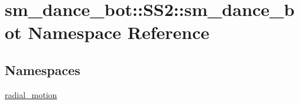 \hypertarget{namespacesm__dance__bot_1_1SS2_1_1sm__dance__bot}{}\section{sm\+\_\+dance\+\_\+bot\+:\+:S\+S2\+:\+:sm\+\_\+dance\+\_\+bot Namespace Reference}
\label{namespacesm__dance__bot_1_1SS2_1_1sm__dance__bot}
\subsection*{Namespaces}
\begin{DoxyCompactItemize}
\item 
 \hyperlink{namespacesm__dance__bot_1_1SS2_1_1sm__dance__bot_1_1radial__motion}{radial\+\_\+motion}
\end{DoxyCompactItemize}
